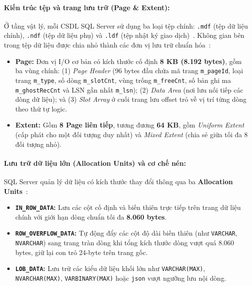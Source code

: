\paragraph{Kiến trúc tệp và trang lưu trữ (Page \& Extent):}
Ở tầng vật lý, mỗi CSDL SQL Server sử dụng ba loại tệp chính: \texttt{.mdf} (tệp dữ liệu chính), \texttt{.ndf} (tệp dữ liệu phụ) và \texttt{.ldf} (tệp nhật ký giao dịch)~\cite{t1_mspages}. Không gian bên trong tệp dữ liệu được chia nhỏ thành các đơn vị lưu trữ chuẩn hóa~\cite{t1_delaney2012,t1_mspages}:
\begin{itemize}
  \item \textbf{Page:} Đơn vị I/O cơ bản có kích thước cố định \textbf{8 KB (8.192 bytes)}, gồm ba vùng chính: (1) \textit{Page Header} (96 bytes đầu chứa mã trang \texttt{m\_pageId}, loại trang \texttt{m\_type}, số dòng \texttt{m\_slotCnt}, vùng trống \texttt{m\_freeCnt}, số bản ghi ma \texttt{m\_ghostRecCnt} và LSN gần nhất \texttt{m\_lsn}); (2) \textit{Data Area} (nơi lưu nối tiếp các dòng dữ liệu); và (3) \textit{Slot Array} ở cuối trang lưu offset trỏ về vị trí từng dòng theo thứ tự logic.
  \item \textbf{Extent:} Gồm \textbf{8 Page liên tiếp}, tương đương \textbf{64 KB}, gồm \textit{Uniform Extent} (cấp phát cho một đối tượng duy nhất) và \textit{Mixed Extent} (chia sẻ giữa tối đa 8 đối tượng nhỏ).
\end{itemize}

\paragraph{Lưu trữ dữ liệu lớn (Allocation Units) và cơ chế nén:}
SQL Server quản lý dữ liệu có kích thước thay đổi thông qua ba \textbf{Allocation Units}~\cite{t1_mspages}:
\begin{itemize}
  \item \textbf{\texttt{IN\_ROW\_DATA}:} Lưu các cột cố định và biến thiên trực tiếp trên trang dữ liệu chính với giới hạn dòng chuẩn tối đa \textbf{8.060 bytes}.
  \item \textbf{\texttt{ROW\_OVERFLOW\_DATA}:} Tự động đẩy các cột độ dài biến thiên (như \texttt{VARCHAR}, \texttt{NVARCHAR}) sang trang tràn dòng khi tổng kích thước dòng vượt quá 8.060 bytes, giữ lại con trỏ 24-byte trên trang gốc.
  \item \textbf{\texttt{LOB\_DATA}:} Lưu trữ các kiểu dữ liệu khối lớn như \texttt{VARCHAR(MAX)}, \texttt{NVARCHAR(MAX)}, \texttt{VARBINARY\allowbreak(MAX)} hoặc \texttt{json} vượt ngưỡng lưu nội dòng.
\end{itemize}

